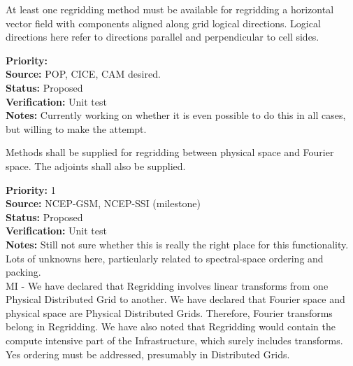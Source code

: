
At least one regridding method must be available for regridding a horizontal
vector field with components aligned along grid logical directions.
Logical directions here refer to directions parallel and perpendicular
to cell sides.

\begin{reqlist}
{\bf Priority:}  \\
{\bf Source:}  POP, CICE, CAM desired. \\
{\bf Status:} Proposed \\
{\bf Verification:} Unit test \\
{\bf Notes:} Currently working on whether it is even possible to do this
             in all cases, but willing to make the attempt.
\end{reqlist}


Methods shall be supplied for regridding between physical space and
Fourier space.  The adjoints shall also be supplied.

\begin{reqlist}
{\bf Priority:} 1 \\
{\bf Source:}  NCEP-GSM, NCEP-SSI (milestone) \\
{\bf Status:} Proposed \\
{\bf Verification:} Unit test \\
{\bf Notes:} Still not sure whether this is really the right place
             for this functionality.
             Lots of unknowns here, particularly related to
             spectral-space ordering and packing.
             \\
             MI - We have declared that Regridding involves linear transforms
             from one Physical Distributed Grid to another.
             We have declared that Fourier space and physical space are
             Physical Distributed Grids.
             Therefore, Fourier transforms belong in Regridding.
             We have also noted that Regridding would contain the
             compute intensive part of the Infrastructure,
             which surely includes transforms.
             Yes ordering must be addressed, presumably in Distributed Grids.
\end{reqlist}


